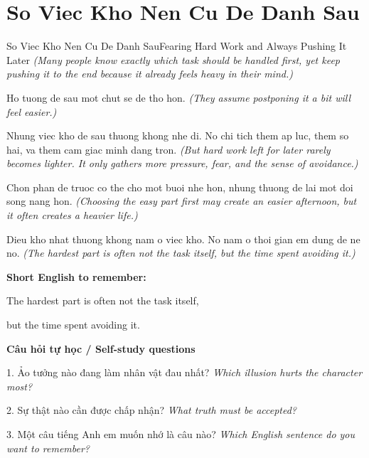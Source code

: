\section{So Viec Kho Nen Cu De Danh Sau}
\begin{truyen}{So Viec Kho Nen Cu De Danh Sau}{Fearing Hard Work and Always Pushing It Later}
\textit{(Many people know exactly which task should be handled first, yet keep pushing it to the end because it already feels heavy in their mind.)}

Ho tuong de sau mot chut se de tho hon.
\textit{(They assume postponing it a bit will feel easier.)}

Nhung viec kho de sau thuong khong nhe di. No chi tich them ap luc, them so hai, va them cam giac minh dang tron.
\textit{(But hard work left for later rarely becomes lighter. It only gathers more pressure, fear, and the sense of avoidance.)}

Chon phan de truoc co the cho mot buoi nhe hon, nhung thuong de lai mot doi song nang hon.
\textit{(Choosing the easy part first may create an easier afternoon, but it often creates a heavier life.)}

\end{truyen}

\begin{baihoc}
Dieu kho nhat thuong khong nam o viec kho. No nam o thoi gian em dung de ne no.
\textit{(The hardest part is often not the task itself, but the time spent avoiding it.)}
\end{baihoc}

\begin{ghinhoanh}
\textbf{Short English to remember:}

The hardest part is often not the task itself,

but the time spent avoiding it.

\end{ghinhoanh}

\begin{tuhocnhanh}
\textbf{Câu hỏi tự học / Self-study questions}

1. Ảo tưởng nào đang làm nhân vật đau nhất? \textit{Which illusion hurts the character most?}

2. Sự thật nào cần được chấp nhận? \textit{What truth must be accepted?}

3. Một câu tiếng Anh em muốn nhớ là câu nào? \textit{Which English sentence do you want to remember?}
\end{tuhocnhanh}
\ngancach

